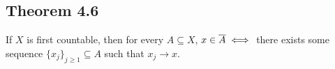 \documentclass[../../main.tex]{subfiles}
\begin{document}
\subsection{Theorem 4.6}
\begin{wts}
    If $X$ is first countable, then for every $A\subseteq X$, $x\in \overline{A}\iff$ there exists some sequence $\{x_j\}_{j\geq 1}\subseteq A$ such that $x_j\to x$.
\end{wts}
\end{document}
